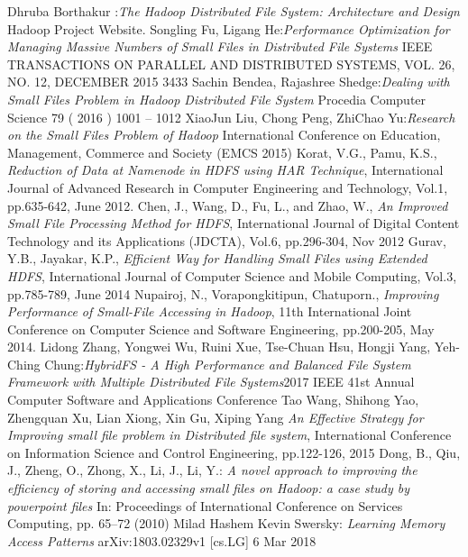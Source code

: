 \documentclass[UTF8]{ctexart}
\begin{document}
\begin{thebibliography}{99}
 Dhruba Borthakur :\emph{The Hadoop Distributed File System: Architecture and Design}  Hadoop Project Website.
Songling Fu, Ligang He:\emph{Performance Optimization for Managing Massive Numbers of Small Files in Distributed File Systems} IEEE TRANSACTIONS ON PARALLEL AND DISTRIBUTED SYSTEMS, VOL. 26, NO. 12, DECEMBER 2015 3433
Sachin Bendea, Rajashree Shedge:\emph{Dealing with Small Files Problem in Hadoop Distributed File System} Procedia Computer Science 79 ( 2016 ) 1001 – 1012
XiaoJun Liu, Chong Peng, ZhiChao Yu:\emph{Research on the Small Files Problem of Hadoop} International Conference on Education, Management, Commerce and Society (EMCS 2015)
Korat, V.G., Pamu, K.S., \emph{Reduction of Data at Namenode in HDFS using HAR Technique}, International Journal of Advanced Research in Computer Engineering and Technology, Vol.1, pp.635-642, June 2012.
Chen, J., Wang, D., Fu, L., and Zhao, W., \emph{An Improved Small File Processing Method for HDFS}, International Journal of Digital Content
Technology and its Applications (JDCTA), Vol.6, pp.296-304, Nov 2012
Gurav, Y.B., Jayakar, K.P., \emph{Efficient Way for Handling Small Files using Extended HDFS}, International Journal of Computer Science and
Mobile Computing, Vol.3, pp.785-789, June 2014
Nupairoj, N., Vorapongkitipun, Chatuporn., \emph{Improving Performance of Small-File Accessing in Hadoop}, 11th International Joint
Conference on Computer Science and Software Engineering, pp.200-205, May 2014.
Lidong Zhang, Yongwei Wu, Ruini Xue, Tse-Chuan Hsu, Hongji Yang, Yeh-Ching Chung:\emph{HybridFS - A High Performance and Balanced File System Framework with Multiple Distributed File Systems}2017 IEEE 41st Annual Computer Software and Applications Conference
Tao Wang, Shihong Yao, Zhengquan Xu, Lian Xiong, Xin Gu, Xiping Yang \emph{An Effective Strategy for Improving small file problem in Distributed file system}, International Conference on Information Science and Control Engineering, pp.122-126, 2015
Dong, B., Qiu, J., Zheng, O., Zhong, X., Li, J., Li, Y.: \emph{A novel approach to improving the efﬁciency of storing and accessing small ﬁles on Hadoop: a case study by powerpoint ﬁles} In: Proceedings of International Conference on Services Computing, pp. 65–72 (2010) 
Milad Hashem Kevin Swersky: \emph{Learning Memory Access Patterns} arXiv:1803.02329v1 [cs.LG] 6 Mar 2018
\end{thebibliography}
\end{document}
